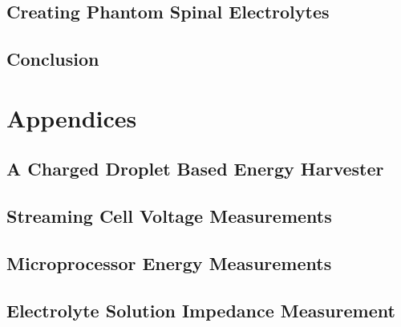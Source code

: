   \chapter{Creating Phantom Spinal Electrolytes}
    \label{chap:fluid_mimicry}
    

  \chapter{Conclusion}

 \part{Appendices}

   \appendix

   \chapter{A Charged Droplet Based Energy Harvester}
     \label{appendix:chargedDropletts}
     

   \chapter{Streaming Cell Voltage Measurements}
     \label{appendix:streamingCellMeasurements}
     

   \chapter{Microprocessor Energy Measurements}
     

   \chapter{Electrolyte Solution Impedance Measurement}
     

